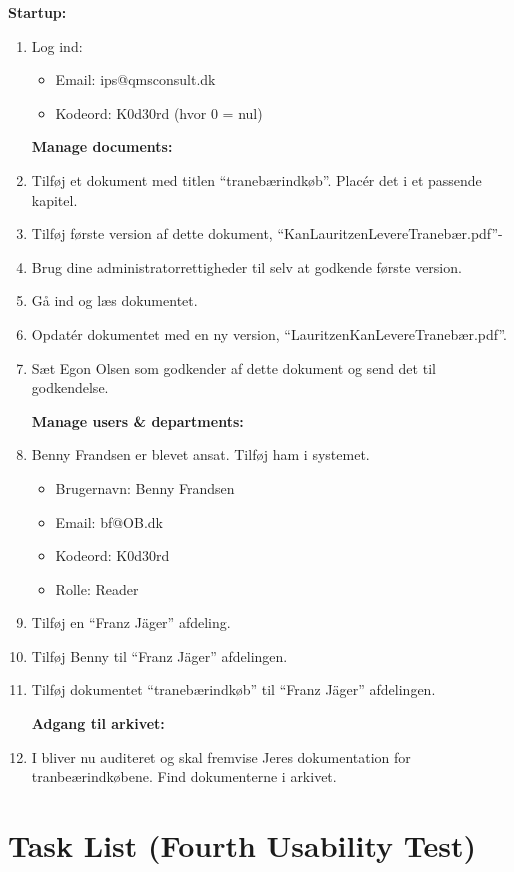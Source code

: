 \textbf{Startup:}
\begin{enumerate}
	\item Log ind:
		\begin{itemize}
			\item Email: ips@qmsconsult.dk
			\item Kodeord: K0d30rd   (hvor 0 = nul)
		\end{itemize}

\textbf{Manage documents:}
	\item Tilføj et dokument med titlen “tranebærindkøb”. Placér det i et passende kapitel.
	\item Tilføj første version af dette dokument, “KanLauritzenLevereTranebær.pdf”-
	\item Brug dine administratorrettigheder til selv at godkende første version.
	\item Gå ind og læs dokumentet.
	\item Opdatér dokumentet med en ny version, “LauritzenKanLevereTranebær.pdf”.
	\item Sæt Egon Olsen som godkender af dette dokument og send det til godkendelse.

\textbf{Manage users \& departments:}
	\item Benny Frandsen er blevet ansat. Tilføj ham i systemet.
		\begin{itemize}
			\item Brugernavn: Benny Frandsen
			\item Email: bf@OB.dk
			\item Kodeord: K0d30rd
			\item Rolle: Reader
		\end{itemize}
	\item Tilføj en “Franz Jäger” afdeling.
	\item Tilføj Benny til “Franz Jäger” afdelingen.
	\item Tilføj dokumentet “tranebærindkøb” til “Franz Jäger” afdelingen.

\textbf{Adgang til arkivet:}
	\item I bliver nu auditeret og skal fremvise Jeres dokumentation for tranbeærindkøbene. Find dokumenterne i arkivet.
\end{enumerate}


\section{Task List (Fourth Usability Test)} \label{sec:utest4tasklist}

